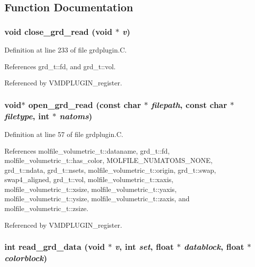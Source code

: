 \subsection{Function Documentation}
\subsubsection{\setlength{\rightskip}{0pt plus 5cm}void close\_\-grd\_\-read (void $\ast$ {\em v})\hspace{0.3cm}{\tt  [static]}}\label{grdplugin_8C_a4}




Definition at line 233 of file grdplugin.C.

References grd\_\-t::fd, and grd\_\-t::vol.

Referenced by VMDPLUGIN\_\-register.
\subsubsection{\setlength{\rightskip}{0pt plus 5cm}void$\ast$ open\_\-grd\_\-read (const char $\ast$ {\em filepath}, const char $\ast$ {\em filetype}, int $\ast$ {\em natoms})\hspace{0.3cm}{\tt  [static]}}\label{grdplugin_8C_a1}




Definition at line 57 of file grdplugin.C.

References molfile\_\-volumetric\_\-t::dataname, grd\_\-t::fd, molfile\_\-volumetric\_\-t::has\_\-color, MOLFILE\_\-NUMATOMS\_\-NONE, grd\_\-t::ndata, grd\_\-t::nsets, molfile\_\-volumetric\_\-t::origin, grd\_\-t::swap, swap4\_\-aligned, grd\_\-t::vol, molfile\_\-volumetric\_\-t::xaxis, molfile\_\-volumetric\_\-t::xsize, molfile\_\-volumetric\_\-t::yaxis, molfile\_\-volumetric\_\-t::ysize, molfile\_\-volumetric\_\-t::zaxis, and molfile\_\-volumetric\_\-t::zsize.

Referenced by VMDPLUGIN\_\-register.
\subsubsection{\setlength{\rightskip}{0pt plus 5cm}int read\_\-grd\_\-data (void $\ast$ {\em v}, int {\em set}, float $\ast$ {\em datablock}, float $\ast$ {\em colorblock})\hspace{0.3cm}{\tt  [static]}}\label{grdplugin_8C_a3}





